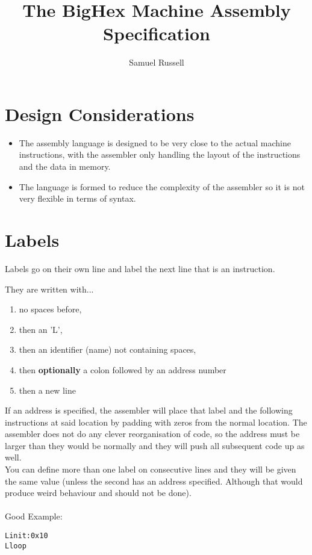 \documentclass[10pt,a4paper]{article}
\author{Samuel Russell}
\title{The BigHex Machine Assembly Specification}
\begin{document}
\maketitle


\section{Design Considerations}
\begin{itemize}
  \item The assembly language is designed to be very close to the actual machine instructions, with the assembler only  handling the layout of the instructions and the data in memory.
  \item The language is formed to reduce the complexity of the assembler so it is not very flexible in terms of syntax.
\end{itemize}
 

\section{Labels}

Labels go on their own line and label the next line that is an instruction.

They are written with...
\begin{enumerate}
 \item no spaces before,
 \item then an 'L',
 \item then an identifier (name) not containing spaces,
 \item then \textbf{optionally} a colon followed by an address number
 \item then a new line
\end{enumerate}

If an address is specified, the assembler will place that label and the following instructions at said location by padding with zeros from the normal location. The assembler does not do any clever reorganisation of code, so the address must be larger than they would be normally and they will push all subsequent code up as well.\\

You can define more than one label on consecutive lines and they will be given the same value (unless the second has an address specified. Although that would produce weird behaviour and should not be done).
\\\\
\noindent Good Example:
\begin{lstlisting}[frame=single]
Linit:0x10
Lloop
\end{lstlisting}
\end{document}

